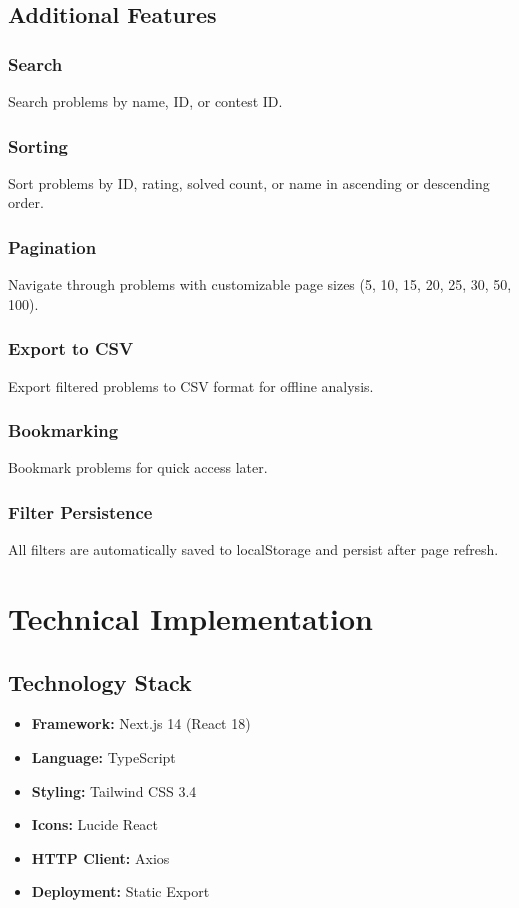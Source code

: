 \documentclass[12pt,a4paper]{article}
\begin{document}
\subsection{Additional Features}

\subsubsection{Search}
Search problems by name, ID, or contest ID.

\subsubsection{Sorting}
Sort problems by ID, rating, solved count, or name in ascending or descending order.

\subsubsection{Pagination}
Navigate through problems with customizable page sizes (5, 10, 15, 20, 25, 30, 50, 100).

\subsubsection{Export to CSV}
Export filtered problems to CSV format for offline analysis.

\subsubsection{Bookmarking}
Bookmark problems for quick access later.

\subsubsection{Filter Persistence}
All filters are automatically saved to localStorage and persist after page refresh.

\newpage

\section{Technical Implementation}

\subsection{Technology Stack}
\begin{itemize}[leftmargin=*]
    \item \textbf{Framework:} Next.js 14 (React 18)
    \item \textbf{Language:} TypeScript
    \item \textbf{Styling:} Tailwind CSS 3.4
    \item \textbf{Icons:} Lucide React
    \item \textbf{HTTP Client:} Axios
    \item \textbf{Deployment:} Static Export
\end{itemize}
\end{document}
